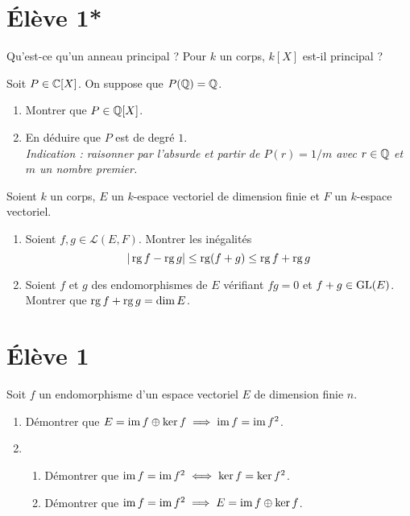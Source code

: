 \documentclass[9pt]{scrartcl}
\title{}
\author{}
\date{}
\begin{document}
    \maketitle
    \section*{Élève 1*}
    \begin{qc}
        Qu'est-ce qu'un anneau principal ? Pour $k$ un corps, $k[X]$ est-il principal ?
    \end{qc}

    \begin{exo}
        Soit $P\in\operatorname{\mathbb C}[X]$. On suppose que $P(\operatorname{\mathbb Q})=\operatorname{\mathbb Q}$.
        \begin{enumerate}
            \item Montrer que $P\in\operatorname{\mathbb Q}[X]$.
            \item En déduire que $P$ est de degré $1$.\\
            \textit{Indication : raisonner par l'absurde et partir de $P(r)=1/m$ avec $r\in \operatorname{\mathbb Q}$ et $m$ un nombre premier.}
        \end{enumerate}
    \end{exo}

    \begin{exo}
        Soient $k$ un corps, $E$ un $k$-espace vectoriel de dimension finie et $F$ un $k$-espace vectoriel.
        \begin{enumerate}
            \item Soient $f,g\in\mathcal L(E,F)$. Montrer les inégalités 
            \[
                |\operatorname{rg} f - \operatorname{rg} g|\leq \operatorname{rg}(f+g)\leq \operatorname{rg} f + \operatorname{rg} g
            \]
            \item Soient $f$ et $g$ des endomorphismes de $E$ vérifiant $fg=0$ et $f+g\in\operatorname{GL}(E)$. Montrer que $\operatorname{rg} f+\operatorname{rg} g = \dim E$.
        \end{enumerate}
    \end{exo}

    \newpage 
    \section*{Élève 1}
    \begin{ccp}
        Soit $f$ un endomorphisme d'un espace vectoriel $E$ de dimension finie $n$.
        \begin{enumerate}
            \item Démontrer que $E=\operatorname{im} f \oplus \operatorname{ker} f\implies \operatorname{im} f = \operatorname{im} f^2$.
            \item 
            \begin{enumerate}
                \item Démontrer que $\operatorname{im} f = \operatorname{im} f^2\iff \operatorname{ker} f = \operatorname{ker} f^2$.
                \item Démontrer que $\operatorname{im} f = \operatorname{im} f^2 \implies E = \operatorname{im} f \oplus \operatorname{ker} f$.
            \end{enumerate}
        \end{enumerate}
    \end{ccp}
\end{document}
